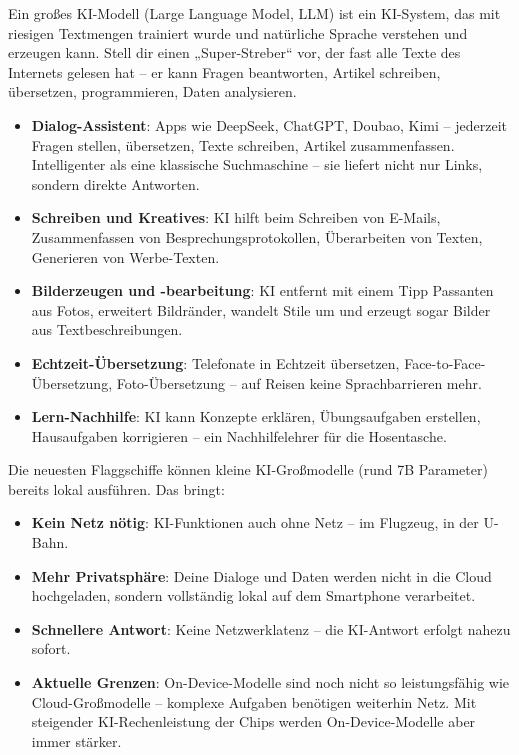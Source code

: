 Ein großes KI-Modell (Large Language Model, LLM) ist ein KI-System, das mit riesigen Textmengen trainiert wurde und natürliche Sprache verstehen und erzeugen kann. Stell dir einen „Super-Streber“ vor, der fast alle Texte des Internets gelesen hat – er kann Fragen beantworten, Artikel schreiben, übersetzen, programmieren, Daten analysieren.


\begin{itemize}
  \item \textbf{Dialog-Assistent}: Apps wie DeepSeek, ChatGPT, Doubao, Kimi – jederzeit Fragen stellen, übersetzen, Texte schreiben, Artikel zusammenfassen. Intelligenter als eine klassische Suchmaschine – sie liefert nicht nur Links, sondern direkte Antworten.
  \item \textbf{Schreiben und Kreatives}: KI hilft beim Schreiben von E-Mails, Zusammenfassen von Besprechungsprotokollen, Überarbeiten von Texten, Generieren von Werbe-Texten.
  \item \textbf{Bilderzeugen und -bearbeitung}: KI entfernt mit einem Tipp Passanten aus Fotos, erweitert Bildränder, wandelt Stile um und erzeugt sogar Bilder aus Textbeschreibungen.
  \item \textbf{Echtzeit-Übersetzung}: Telefonate in Echtzeit übersetzen, Face-to-Face-Übersetzung, Foto-Übersetzung – auf Reisen keine Sprachbarrieren mehr.
  \item \textbf{Lern-Nachhilfe}: KI kann Konzepte erklären, Übungsaufgaben erstellen, Hausaufgaben korrigieren – ein Nachhilfelehrer für die Hosentasche.
\end{itemize}


Die neuesten Flaggschiffe können kleine KI-Großmodelle (rund 7B Parameter) bereits lokal ausführen. Das bringt:

\begin{itemize}
  \item \textbf{Kein Netz nötig}: KI-Funktionen auch ohne Netz – im Flugzeug, in der U-Bahn.
  \item \textbf{Mehr Privatsphäre}: Deine Dialoge und Daten werden nicht in die Cloud hochgeladen, sondern vollständig lokal auf dem Smartphone verarbeitet.
  \item \textbf{Schnellere Antwort}: Keine Netzwerklatenz – die KI-Antwort erfolgt nahezu sofort.
  \item \textbf{Aktuelle Grenzen}: On-Device-Modelle sind noch nicht so leistungsfähig wie Cloud-Großmodelle – komplexe Aufgaben benötigen weiterhin Netz. Mit steigender KI-Rechenleistung der Chips werden On-Device-Modelle aber immer stärker.
\end{itemize}

